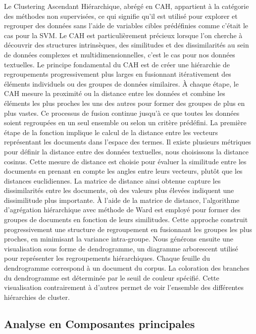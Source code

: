 Le Clustering Ascendant Hiérarchique, abrégé en CAH, appartient à la catégorie des méthodes non supervisées, ce qui signifie qu'il est utilisé pour explorer et regrouper des données sans l'aide de variables cibles prédéfinies comme c'était le cas pour la SVM. Le CAH est particulièrement précieux lorsque l'on cherche à découvrir des structures intrinsèques, des similitudes et des dissimilarités au sein de données complexes et multidimensionnelles, c'est le cas pour nos données textuelles.
Le principe fondamental du CAH est de créer une hiérarchie de regroupements progressivement plus larges en fusionnant itérativement des éléments individuels ou des groupes de données similaires. À chaque étape, le CAH mesure la proximité ou la distance entre les données et combine les éléments les plus proches les uns des autres pour former des groupes de plus en plus vastes. Ce processus de fusion continue jusqu'à ce que toutes les données soient regroupées en un seul ensemble ou selon un critère prédéfini.
La première étape de la fonction implique le calcul de la distance entre les vecteurs représentant les documents dans l'espace des termes. Il existe plusieurs métriques pour définir la distance entre des données textuelles, nous choisissons la distance cosinus. Cette mesure de distance est choisie pour évaluer la similitude entre les documents en prenant en compte les angles entre leurs vecteurs, plutôt que les distances euclidiennes. La matrice de distance ainsi obtenue capture les dissimilarités entre les documents, où des valeurs plus élevées indiquent une dissimilitude plus importante.
À l'aide de la matrice de distance, l'algorithme d'agrégation hiérarchique avec méthode de Ward est employé pour former des groupes de documents en fonction de leurs similitudes. Cette approche construit progressivement une structure de regroupement en fusionnant les groupes les plus proches, en minimisant la variance intra-groupe. Nous générons ensuite une visualisation sous forme de dendrogramme, un diagramme arborescent utilisé pour représenter les regroupements hiérarchiques. Chaque feuille du dendrogramme correspond à un document du corpus. La coloration des branches du dendrogramme est déterminée par le seuil de couleur spécifié. Cette visualisation contrairement à d'autres permet de voir l'ensemble des différentes hiérarchies de cluster.

\subsection{Analyse en Composantes principales}

